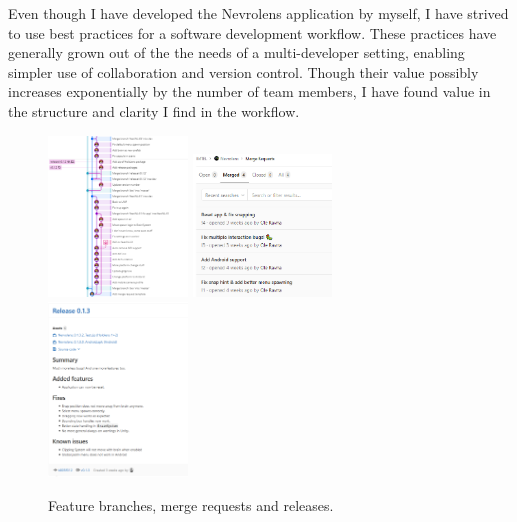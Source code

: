 
Even though I have developed the Nevrolens application by myself, I have strived to use best practices for a software development workflow. These practices have generally grown out of the the needs of a multi-developer setting, enabling simpler use of collaboration and version control. Though their value possibly increases exponentially by the number of team members, I have found value in the structure and clarity I find in the workflow. 

\begin{figure}[h]
    \includegraphics[width=0.33\textwidth]{fig/gitkraken_gitlog}
    \includegraphics[width=0.33\textwidth]{fig/mergerequests}
    \includegraphics[width=0.33\textwidth]{fig/release_gitlab}
    \caption{Feature branches, merge requests and releases.}
\end{figure}

